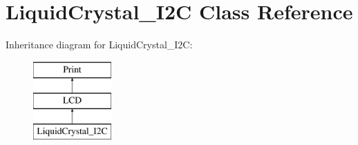 \hypertarget{class_liquid_crystal___i2_c}{}\section{Liquid\+Crystal\+\_\+\+I2\+C Class Reference}
\label{class_liquid_crystal___i2_c}
Inheritance diagram for Liquid\+Crystal\+\_\+\+I2\+C\+:\begin{figure}[H]
\begin{center}
\leavevmode
\includegraphics[height=3.000000cm]{class_liquid_crystal___i2_c}
\end{center}
\end{figure}
